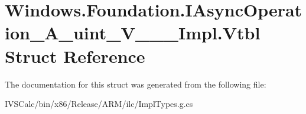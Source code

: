 \hypertarget{struct_windows_1_1_foundation_1_1_i_async_operation___a__uint___v_______impl_1_1_vtbl}{}\section{Windows.\+Foundation.\+I\+Async\+Operation\+\_\+\+A\+\_\+uint\+\_\+\+V\+\_\+\+\_\+\+\_\+\+Impl.\+Vtbl Struct Reference}
\label{struct_windows_1_1_foundation_1_1_i_async_operation___a__uint___v_______impl_1_1_vtbl}


The documentation for this struct was generated from the following file\+:\begin{DoxyCompactItemize}
\item 
I\+V\+S\+Calc/bin/x86/\+Release/\+A\+R\+M/ilc/Impl\+Types.\+g.\+cs\end{DoxyCompactItemize}
